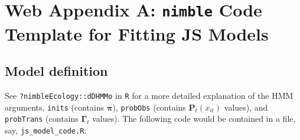 \documentclass[12pt]{article}
\newcommand{\bP}{\ensuremath{\mathbf{P}}}
\newcommand{\bpi}{\ensuremath{\boldsymbol{\pi}}}
\newcommand{\bG}{\ensuremath{\boldsymbol{\Gamma}}}
\begin{document}
\vspace*{\fill}

\clearpage



\renewcommand{\baselinestretch}{1.25}\normalsize
\raggedright
\setlength{\parindent}{2em}
\raggedbottom


\section*{Web Appendix A: {\tt nimble} Code Template for Fitting JS Models}

\subsection{Model definition}

See {\tt ?nimbleEcology::dDHMMo} in {\tt R} for a more detailed explanation of the HMM arguments, {\tt inits} (contains $\bpi$), {\tt probObs} (contains $\bP_t(x_{it})$ values), and {\tt probTrans} (contains $\bG_t$ values). The following code would be contained in a file, say, \verb|js_model_code.R|:
\end{document}
